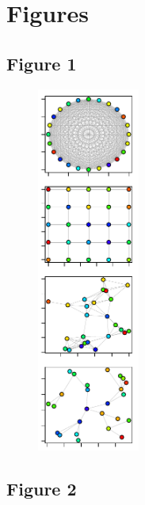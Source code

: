 \documentclass[12pt]{article}
\begin{document}
\newpage

\section*{Figures}

\subsection*{Figure 1}

\begin{figure}[ht!]
	\centering\includegraphics[width=0.3\textwidth]{Networks.pdf}
\end{figure}

\newpage

\subsection*{Figure 2}
\end{document}
